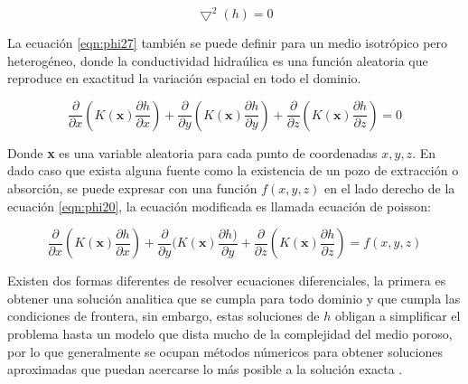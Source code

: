 \begin{equation}
\label{eqn:phi27}
\bigtriangledown^{2}(h)=0
\end{equation}

La ecuación \ref{eqn:phi27} también se puede definir para un medio isotrópico pero heterogéneo, donde la conductividad hidraúlica es una función aleatoria que reproduce en exactitud la variación espacial en todo el dominio.

\begin{equation}
\label{eqn:phi28}                         
\dfrac{\partial}{\partial{x}}(K(\textbf{x})\dfrac{\partial{h}}{\partial{x}})+\dfrac{\partial}{\partial{y}}(K(\textbf{x})\dfrac{\partial{h}}{\partial{y}})+\dfrac{\partial}{\partial{z}}(K(\textbf{x})\dfrac{\partial{h}}{\partial{z}})=0
\end{equation}

Donde \textbf{x} es una variable aleatoria para cada punto de coordenadas ${x,y,z}$. En dado caso que exista alguna fuente como la existencia de un pozo de extracción o absorción, se puede expresar con una función $f(x,y,z)$ en el lado derecho de la ecuación \ref{eqn:phi20}, la ecuación modificada es llamada ecuación de poisson:
 
 \begin{equation}
\label{eqn:phi29}                         
\dfrac{\partial}{\partial{x}}(K(\textbf{x})\dfrac{\partial{h}}{\partial{x}})+\dfrac{\partial}{\partial{y}}(K(\textbf{x})\dfrac{\partial{h})}{\partial{y}}+\dfrac{\partial}{\partial{z}}(K(\textbf{x})\dfrac{\partial{h}}{\partial{z}})=f(x,y,z)
\end{equation}

Existen dos formas diferentes de resolver ecuaciones diferenciales, la primera es obtener una solución analitica que se cumpla para todo dominio y que cumpla las condiciones de frontera, sin embargo, estas soluciones de $h$ obligan a simplificar el problema hasta un modelo que dista mucho de la complejidad del medio poroso, por lo que generalmente se ocupan métodos númericos para obtener soluciones aproximadas que puedan acercarse lo más posible a la solución exacta \cite{Toth2009} \cite{Freeze1979}.
